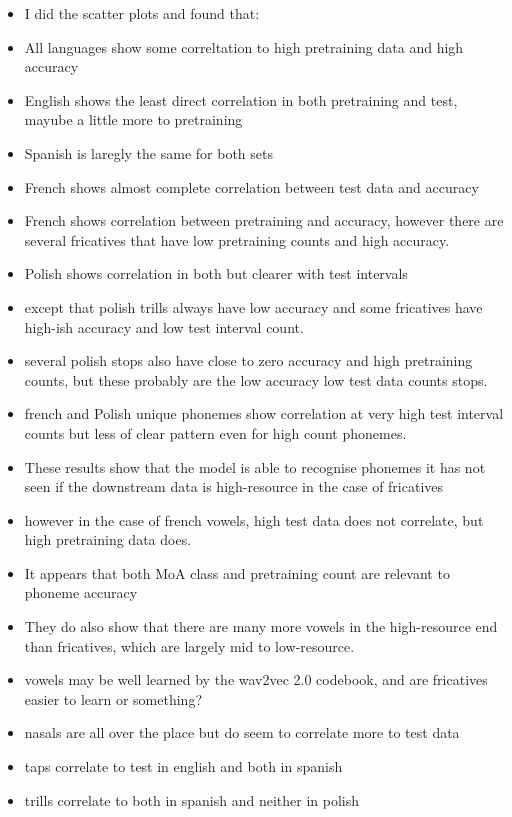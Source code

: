 \begin{itemize}
\begin{itemize}
    \end{itemize}
    \item I did the scatter plots and found that:
    \item All languages show some correltation to high pretraining data and high accuracy
    \item English shows the least direct correlation in both pretraining and test, mayube a little more to pretraining
    \item Spanish is laregly the same for both sets
    \item French shows almost complete correlation between test data and accuracy
    \item French shows correlation between pretraining and accuracy, however there are several fricatives that have low pretraining counts and high accuracy.
    \item Polish shows correlation in both but clearer with test intervals 
    \item except that polish trills always have low accuracy and some fricatives have high-ish accuracy and low test interval count.
    \item several polish stops also have close to zero accuracy and high pretraining counts, but these probably are the low accuracy low test data counts stops.
    \item french and Polish unique phonemes show correlation at very high test interval counts but less of clear pattern even for high count phonemes.
    \item These results show that the model is able to recognise phonemes it has not seen if the downstream data is high-resource in the case of fricatives
    \item however in the case of french vowels, high test data does not correlate, but high pretraining data does.
    \item It appears that both MoA class and pretraining count are relevant to phoneme accuracy
    \item They do also show that there are many more vowels in the high-resource end than fricatives, which are largely mid to low-resource.
    \item vowels may be well learned by the wav2vec 2.0 codebook, and are fricatives easier to learn or something?
    \item nasals are all over the place but do seem to correlate more to test data
    \item taps correlate to test in english and both in spanish
    \item trills correlate to both in spanish and neither in polish

\end{itemize}
